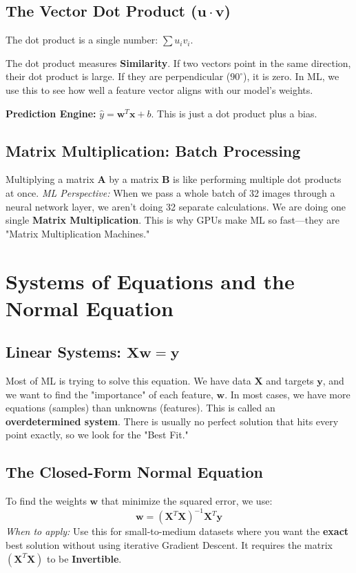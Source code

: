 \documentclass{article}
\begin{document}
\subsection{The Vector Dot Product ($\mathbf{u} \cdot \mathbf{v}$)}
The dot product is a single number: $\sum u_i v_i$.
\begin{tcolorbox}[title=The Geometric Intuition]
The dot product measures \textbf{Similarity}. If two vectors point in the same direction, their dot product is large. If they are perpendicular ($90^\circ$), it is zero. In ML, we use this to see how well a feature vector aligns with our model's weights.
\end{tcolorbox}
\textbf{Prediction Engine:} $\hat{y} = \mathbf{w}^T \mathbf{x} + b$. This is just a dot product plus a bias.

\subsection{Matrix Multiplication: Batch Processing}
Multiplying a matrix $\mathbf{A}$ by a matrix $\mathbf{B}$ is like performing multiple dot products at once. 
\textit{ML Perspective:} When we pass a whole batch of 32 images through a neural network layer, we aren't doing 32 separate calculations. We are doing one single \textbf{Matrix Multiplication}. This is why GPUs make ML so fast—they are "Matrix Multiplication Machines."

\section{Systems of Equations and the Normal Equation}

\subsection{Linear Systems: $\mathbf{Xw} = \mathbf{y}$}
Most of ML is trying to solve this equation. We have data $\mathbf{X}$ and targets $\mathbf{y}$, and we want to find the "importance" of each feature, $\mathbf{w}$. 
In most cases, we have more equations (samples) than unknowns (features). This is called an \textbf{overdetermined system}. There is usually no perfect solution that hits every point exactly, so we look for the "Best Fit."

\subsection{The Closed-Form Normal Equation}
To find the weights $\mathbf{w}$ that minimize the squared error, we use:
\begin{equation}
    \mathbf{w} = (\mathbf{X}^T \mathbf{X})^{-1} \mathbf{X}^T \mathbf{y}
\end{equation}
\textit{When to apply:} Use this for small-to-medium datasets where you want the \textbf{exact} best solution without using iterative Gradient Descent. It requires the matrix $(\mathbf{X}^T \mathbf{X})$ to be \textbf{Invertible}.
\end{document}
